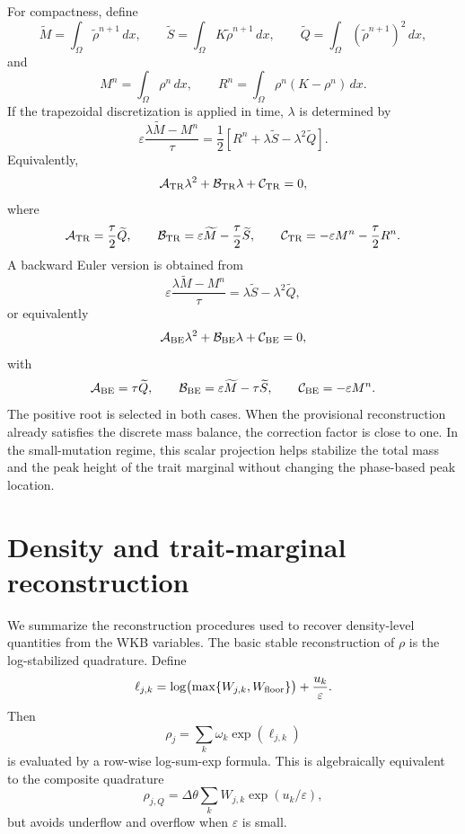 \documentclass[11pt]{article}
\begin{document}
For compactness, define
\[
    \widetilde M
    =
    \int_\Omega \widetilde\rho^{n+1}\,dx,
    \qquad
    \widetilde S
    =
    \int_\Omega K\widetilde\rho^{n+1}\,dx,
    \qquad
    \widetilde Q
    =
    \int_\Omega (\widetilde\rho^{n+1})^2\,dx,
\]
and
\[
    M^n
    =
    \int_\Omega \rho^n\,dx,
    \qquad
    R^n
    =
    \int_\Omega \rho^n(K-\rho^n)\,dx .
\]
If the trapezoidal discretization is applied in time, \(\lambda\) is determined
by
\[
    \varepsilon
    \frac{\lambda\widetilde M-M^n}{\tau}
    =
    \frac12
    \left[
        R^n+\lambda\widetilde S-\lambda^2\widetilde Q
    \right].
\]
Equivalently,
\[
    \mathcal A_{\rm TR}\lambda^2
    +
    \mathcal B_{\rm TR}\lambda
    +
    \mathcal C_{\rm TR}
    =
    0,
\]
where
\[
    \mathcal A_{\rm TR}
    =
    \frac{\tau}{2}\widetilde Q,
    \qquad
    \mathcal B_{\rm TR}
    =
    \varepsilon\widetilde M
    -
    \frac{\tau}{2}\widetilde S,
    \qquad
    \mathcal C_{\rm TR}
    =
    -\varepsilon M^n
    -
    \frac{\tau}{2}R^n .
\]
A backward Euler version is obtained from
\[
    \varepsilon
    \frac{\lambda\widetilde M-M^n}{\tau}
    =
    \lambda\widetilde S-\lambda^2\widetilde Q,
\]
or equivalently
\[
    \mathcal A_{\rm BE}\lambda^2
    +
    \mathcal B_{\rm BE}\lambda
    +
    \mathcal C_{\rm BE}
    =
    0,
\]
with
\[
    \mathcal A_{\rm BE}=\tau\widetilde Q,
    \qquad
    \mathcal B_{\rm BE}=\varepsilon\widetilde M-\tau\widetilde S,
    \qquad
    \mathcal C_{\rm BE}=-\varepsilon M^n .
\]
The positive root is selected in both cases.  When the provisional
reconstruction already satisfies the discrete mass balance, the correction
factor is close to one.  In the small-mutation regime, this scalar projection
helps stabilize the total mass and the peak height of the trait marginal
without changing the phase-based peak location.


\section{Density and trait-marginal reconstruction}
\label{app:reconstruction}

We summarize the reconstruction procedures used to recover density-level
quantities from the WKB variables.  The basic stable reconstruction of
\(\rho\) is the log-stabilized quadrature.  Define
\[
    \ell_{j,k}
    =
    \log\bigl(\max\{W_{j,k},W_{\rm floor}\}\bigr)
    +
    \frac{u_k}{\varepsilon}.
\]
Then
\[
    \rho_j
    =
    \sum_k\omega_k\exp(\ell_{j,k})
\]
is evaluated by a row-wise log-sum-exp formula.  This is algebraically
equivalent to the composite quadrature
\[
    \rho_{j,Q}
    =
    \Delta\theta\sum_k W_{j,k}\exp(u_k/\varepsilon),
\]
but avoids underflow and overflow when \(\varepsilon\) is small.
\end{document}
